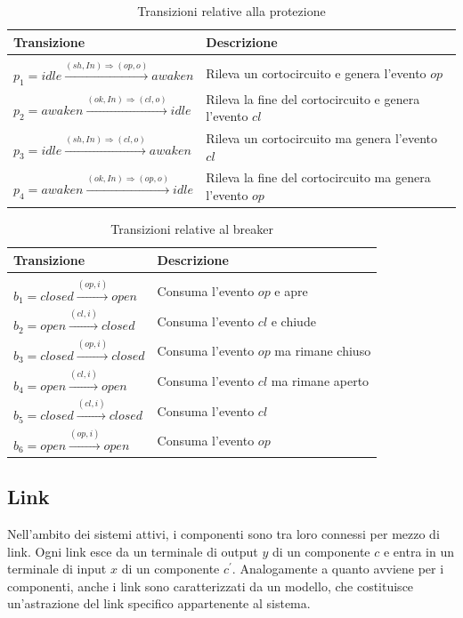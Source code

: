 \begin{table}[htbp] 
\begin{tabularx}{\textwidth}{l X}
\hline
\textbf{Transizione} & \textbf{Descrizione}\\
\hline\\
$p_1 = idle \xrightarrow{(sh,In) \Rightarrow (op,o)} awaken$ & Rileva un cortocircuito e genera l'evento $op$\\[1mm]
$p_2 = awaken \xrightarrow{(ok,In) \Rightarrow (cl,o)} idle$ & Rileva la fine del cortocircuito e genera l'evento $cl$\\[1mm]
$p_3 = idle \xrightarrow{(sh,In) \Rightarrow (cl,o)} awaken$ & Rileva un cortocircuito ma genera l'evento $cl$\\[1mm]
$p_4 = awaken \xrightarrow{(ok,In) \Rightarrow (op,o)} idle$ & Rileva la fine del cortocircuito ma genera l'evento $op$\\[1mm]
\hline
\end{tabularx}
\caption{Transizioni relative alla protezione}
\label{tab:p_trans}
\end{table}

\begin{table}[htbp] 
\begin{tabularx}{\textwidth}{l X}
\hline
\textbf{Transizione} & \textbf{Descrizione}\\
\hline\\
$b_1 = closed \xrightarrow{(op,i)} open$ & Consuma l'evento $op$ e apre\\[1mm]
$b_2 = open \xrightarrow{(cl,i)} closed$ & Consuma l'evento $cl$ e chiude\\[1mm]
$b_3 = closed \xrightarrow{(op,i)} closed$ & Consuma l'evento $op$ ma rimane chiuso\\[1mm]
$b_4 = open \xrightarrow{(cl,i)} open$ & Consuma l'evento $cl$ ma rimane aperto\\[1mm]
$b_5 = closed \xrightarrow{(cl,i)} closed$ & Consuma l'evento $cl$\\[1mm]
$b_6 = open \xrightarrow{(op,i)} open$ & Consuma l'evento $op$\\[1mm]
\hline
\end{tabularx}
\caption{Transizioni relative al breaker}
\label{tab:b_trans}
\end{table}

\subsection{Link}
Nell'ambito dei sistemi attivi, i componenti sono tra loro connessi per mezzo di link. Ogni link esce da un terminale di output $y$ di un componente $c$ e entra in un terminale di input $x$ di un componente $c^\prime$.
Analogamente a quanto avviene per i componenti, anche i link sono caratterizzati da un modello, che costituisce un'astrazione del link specifico appartenente al sistema.

